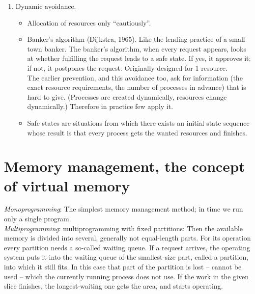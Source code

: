\documentclass[margin=0px]{article}
\begin{document}
\begin{enumerate}
\begin{itemize}
\begin{itemize}
                        \item Coffman's third condition is no-preemption. Avoiding this is quite hard. E.g. during printing it is not fortunate to give the printer to someone else.
                        \item The fourth condition, the circular wait, can be eliminated more easily. A simple way: Every process can hold only 1 resource at a time. Another method: We number the resources, and the processes can request the resources only in this order. This is a good avoidance method, only there is no appropriate order.
                    \end{itemize}
          \end{itemize}
    \item Dynamic avoidance.
          \begin{itemize}
              \item Allocation of resources only ``cautiously''.
              \item Banker's algorithm (Dijkstra, 1965). Like the lending practice of a small-town banker. The banker's algorithm, when every request appears, looks at whether fulfilling the request leads to a safe state. If yes, it approves it; if not, it postpones the request. Originally designed for 1 resource. \\
                    The earlier prevention, and this avoidance too, ask for information (the exact resource requirements, the number of processes in advance) that is hard to give. (Processes are created dynamically, resources change dynamically.) Therefore in practice few apply it.
              \item Safe states are situations from which there exists an initial state sequence whose result is that every process gets the wanted resources and finishes.
          \end{itemize}
\end{enumerate}

\section{Memory management, the concept of virtual memory}

\textit{Monoprogramming}: The simplest memory management method; in time we run only a single program. \\
\textit{Multiprogramming}: multiprogramming with fixed partitions: Then the available memory is divided into several, generally not equal-length parts. For its operation every partition needs a so-called waiting queue. If a request arrives, the operating system puts it into the waiting queue of the smallest-size part, called a partition, into which it still fits. In this case that part of the partition is lost -- cannot be used -- which the currently running process does not use. If the work in the given slice finishes, the longest-waiting one gets the area, and starts operating.
\end{document}
